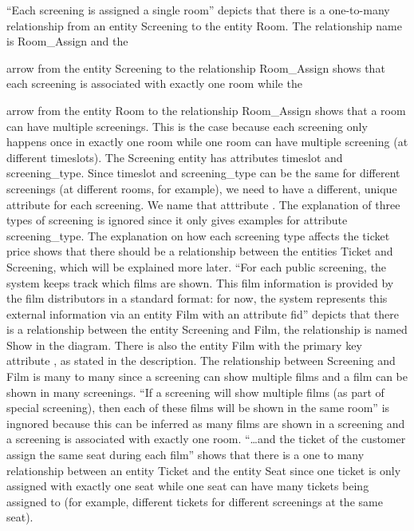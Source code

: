 \documentclass{article}
\newcommand{\key}[1]{\underline{\smash{#1}}}
\newcommand{\pkey}[1]{\dashuline{\smash{#1}}}
\begin{document}
``Each screening is assigned a single room'' depicts that there is a one-to-many
relationship from an entity Screening to the entity Room. The relationship name
is Room\_Assign and the
arrow from the entity Screening to the relationship Room\_Assign shows that each
screening is associated with exactly one room while the
arrow from the entity Room to the relationship Room\_Assign shows that a room
can have multiple screenings. This is the case because each screening only happens
once in exactly one room while one room can have multiple screening (at different
timeslots). The Screening entity has attributes timeslot and screening\_type.
Since timeslot and screening\_type can be the same for different screenings (at
different rooms, for example), we need to have a different, unique attribute for
each screening. We name that atttribute \key{screening\_id}. The explanation of
three types of screening is ignored since it only gives examples for attribute
screening\_type. The explanation on how each screening type affects the ticket
price shows that there should be a relationship between the entities Ticket and
Screening, which will be explained more later. ``For each public screening, the
system keeps track which films are shown. This film information is provided by
the film distributors in a standard format: for now, the system represents this
external information via an entity Film with an attribute fid'' depicts that there
is a relationship between the entity Screening and Film, the relationship is named
Show in the diagram. There is also the entity Film with the primary key attribute
\pkey{fid}, as stated in the description. The relationship between Screening and
Film is many to many since a screening can show multiple films and a film can be
shown in many screenings. ``If a screening will show multiple films (as part of
special screening), then each of these films will be shown in the same room'' is
ingnored because this can be inferred as many films are shown in a screening and
a screening is associated with exactly one room. ``\dots and the
ticket of the customer assign the same seat during each film'' shows that there
is a one to many relationship between an entity Ticket and the entity Seat since
one ticket is only assigned with exactly one seat while one seat can have many
tickets being assigned to (for example, different tickets for different screenings
at the same seat).
\end{document}
